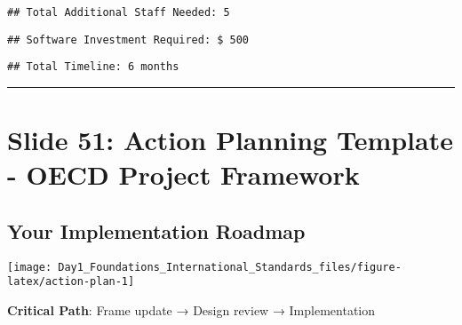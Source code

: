 \documentclass[
]{article}
\newenvironment{Shaded}{\begin{snugshade}}{\end{snugshade}}
\newcommand{\FunctionTok}[1]{\textcolor[rgb]{0.13,0.29,0.53}{\textbf{#1}}}
\newcommand{\NormalTok}[1]{#1}
\newcommand{\SpecialCharTok}[1]{\textcolor[rgb]{0.81,0.36,0.00}{\textbf{#1}}}
\newcommand{\StringTok}[1]{\textcolor[rgb]{0.31,0.60,0.02}{#1}}
\begin{document}
\begin{verbatim}
## Total Additional Staff Needed: 5
\end{verbatim}

\begin{Shaded}
\end{Shaded}

\begin{verbatim}
## Software Investment Required: $ 500
\end{verbatim}

\begin{Shaded}
\end{Shaded}

\begin{verbatim}
## Total Timeline: 6 months
\end{verbatim}

\begin{center}\rule{0.5\linewidth}{0.5pt}\end{center}

\section{Slide 51: Action Planning Template - OECD Project
Framework}\label{slide-51-action-planning-template---oecd-project-framework}

\subsection{Your Implementation
Roadmap}\label{your-implementation-roadmap}

\texttt{[image: Day1\_Foundations\_International\_Standards\_files/figure-latex/action-plan-1]}

\textbf{Critical Path}: Frame update → Design review → Implementation
\end{document}
